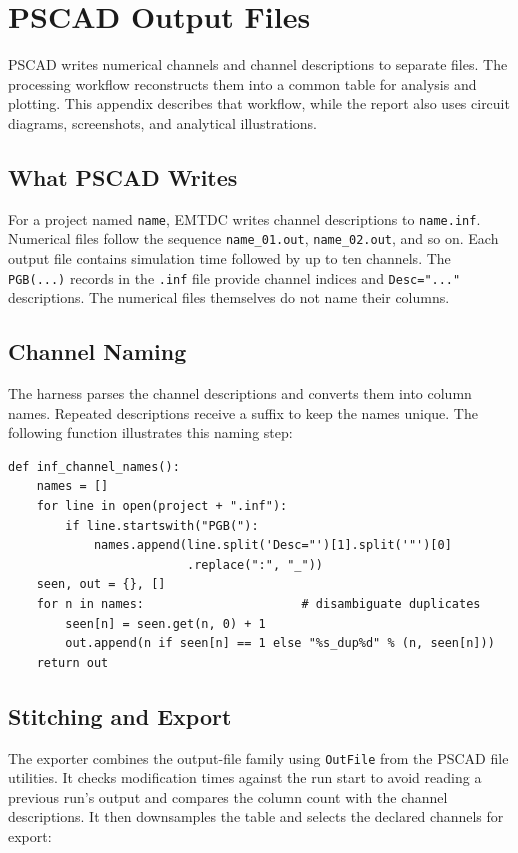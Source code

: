 \documentclass[11pt]{article}
\begin{document}
\section{PSCAD Output Files}
\label{app:plotting}
PSCAD writes numerical channels and channel descriptions to separate files. The processing workflow reconstructs them into a common table for analysis and plotting. This appendix describes that workflow, while the report also uses circuit diagrams, screenshots, and analytical illustrations.

\subsection{What PSCAD Writes}
For a project named \texttt{name}, EMTDC writes channel descriptions to \texttt{name.inf}. Numerical files follow the sequence \texttt{name\_01.out}, \texttt{name\_02.out}, and so on. Each output file contains simulation time followed by up to ten channels. The \texttt{PGB(...)} records in the \texttt{.inf} file provide channel indices and \texttt{Desc="..."} descriptions. The numerical files themselves do not name their columns.

\subsection{Channel Naming}
The harness parses the channel descriptions and converts them into column names. Repeated descriptions receive a suffix to keep the names unique. The following function illustrates this naming step:

\begin{lstlisting}
def inf_channel_names():
    names = []
    for line in open(project + ".inf"):
        if line.startswith("PGB("):
            names.append(line.split('Desc="')[1].split('"')[0]
                         .replace(":", "_"))
    seen, out = {}, []
    for n in names:                      # disambiguate duplicates
        seen[n] = seen.get(n, 0) + 1
        out.append(n if seen[n] == 1 else "%s_dup%d" % (n, seen[n]))
    return out
\end{lstlisting}

\subsection{Stitching and Export}
The exporter combines the output-file family using \texttt{OutFile} from the PSCAD file utilities. It checks modification times against the run start to avoid reading a previous run's output and compares the column count with the channel descriptions. It then downsamples the table and selects the declared channels for export:
\end{document}
